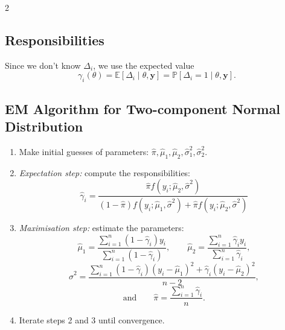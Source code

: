 \documentclass[a4paper,9pt,fleqn]{extarticle}
\begin{document}
\begin{multicols}{2}
\subsection*{Responsibilities}
Since we don't know $\Delta_i$, we use the expected value
\[
\gamma_i(\theta) = \mathbb{E}[\Delta_i \mid \theta, \mathbf{y}] = \mathbb{P}[\Delta_i = 1 \mid \theta, \mathbf{y}].
\]

\subsection*{EM Algorithm for Two-component Normal Distribution}
\begin{enumerate}[label=\textbf{\arabic*.}]
    \item Make initial guesses of parameters: 
    $\hat{\pi}, \hat{\mu}_1, \hat{\mu}_2, \hat{\sigma}_1^2, \hat{\sigma}_2^2$.
  
    \item \textit{Expectation step:} compute the responsibilities:
    \[
    \hat{\gamma}_i = 
    \frac{\hat{\pi} f(y_i; \hat{\mu}_2, \hat{\sigma}^2)}
    {(1 - \hat{\pi}) f(y_i; \hat{\mu}_1, \hat{\sigma}^2) + \hat{\pi} f(y_i; \hat{\mu}_2, \hat{\sigma}^2)}
    \]
  
    \item \textit{Maximisation step:} estimate the parameters:
    \[
    \hat{\mu}_1 = \frac{\sum_{i=1}^n (1 - \hat{\gamma}_i) y_i}{\sum_{i=1}^n (1 - \hat{\gamma}_i)}, 
    \qquad
    \hat{\mu}_2 = \frac{\sum_{i=1}^n \hat{\gamma}_i y_i}{\sum_{i=1}^n \hat{\gamma}_i},
    \]
    \[
    \hat{\sigma}^2 = \frac{
      \sum_{i=1}^n (1 - \hat{\gamma}_i)(y_i - \hat{\mu}_1)^2 
      + \hat{\gamma}_i (y_i - \hat{\mu}_2)^2
    }{n - 2},
    \]
    \[
    \text{and} \qquad 
    \hat{\pi} = \frac{\sum_{i=1}^n \hat{\gamma}_i}{n}.
    \]
  
    \item Iterate steps 2 and 3 until convergence.
  \end{enumerate}
\end{multicols}
\end{document}
